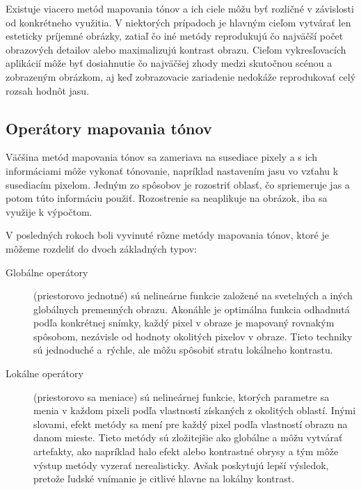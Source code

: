 Existuje viacero metód mapovania tónov a ich ciele môžu byť rozličné v závislosti od konkrétneho využitia.
V niektorých prípadoch je hlavným cieľom vytvárať len esteticky príjemné obrázky, zatiaľ čo iné metódy
reprodukujú čo najväčší počet obrazových detailov alebo maximalizujú kontrast obrazu. Cieľom vykresľovacích 
aplikácií môže byť dosiahnutie čo najväčšej zhody medzi skutočnou scénou a zobrazeným obrázkom, aj keď
zobrazovacie zariadenie nedokáže reprodukovať celý rozsah hodnôt jasu.

\subsection{Operátory mapovania tónov}
\label{sec:Theory-Operators}

Väčšina metód mapovania tónov sa zameriava na susediace pixely a s ich informáciami môže vykonať tónovanie,
napríklad nastavením jasu vo vzťahu k susediacím pixelom. Jedným zo spôsobov je rozostriť oblasť, čo spriemeruje
jas a potom túto informáciu použiť. \cite{ZakladyHDR} Rozostrenie sa neaplikuje na obrázok, iba sa využije
k výpočtom.

V posledných rokoch boli vyvinuté rôzne metódy mapovania tónov, ktoré je môžeme rozdeliť do dvoch základných
typov:
\begin{description}
    \item [Globálne operátory] (priestorovo jednotné) sú nelineárne funkcie založené na svetelných a iných
    globálnych premenných obrazu. Akonáhle je optimálna funkcia odhadnutá podľa konkrétnej snímky, každý pixel
    v obraze je mapovaný rovnakým spôsobom, nezávisle od hodnoty okolitých pixelov v obraze. Tieto techniky 
    sú jednoduché a~rýchle, ale môžu spôsobiť stratu lokálneho kontrastu.
    \cite{AHDR}
    
    \item [Lokálne operátory] (priestorovo sa meniace) sú nelineárnej funkcie, ktorých parametre sa menia
    v každom pixeli podľa vlastností získaných z okolitých oblastí. Inými slovami, efekt metódy sa mení
    pre každý pixel podľa vlastností obrazu na danom mieste. Tieto metódy sú zložitejšie ako globálne
    a môžu vytvárať artefakty, ako napríklad halo efekt alebo kontrastné obrysy a tým môže výstup metódy vyzerať
    nerealisticky. Avšak poskytujú lepší výsledok, pretože ľudské vnímanie je citlivé hlavne na lokálny kontrast.
    \cite{AHDR}
\end{description}

